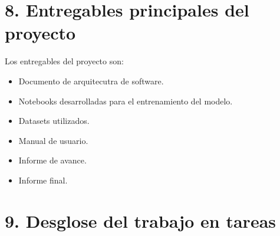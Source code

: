 \documentclass[
11pt %
]{charter}
\begin{document}
\section{8. Entregables principales del proyecto}
\label{sec:entregables}

Los entregables del proyecto son:

\begin{itemize}
	\item Documento de arquitecutra de software.
	\item Notebooks desarrolladas para el entrenamiento del modelo.
	\item Datasets utilizados.
	\item Manual de usuario.
	\item Informe de avance.
	\item Informe final.
\end{itemize}

\section{9. Desglose del trabajo en tareas}
\label{sec:wbs}
\end{document}
